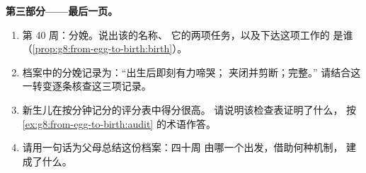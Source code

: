 \begin{problem}
\medskip\noindent\textbf{第三部分——最后一页。}
\begin{enumerate}[resume]
  \item 第 40 周：分娩。说出该的名称、
        它的两项任务，以及下达这项工作的
        是谁（\cref{prop:g8:from-egg-to-birth:birth}）。
  \item 档案中的分娩记录为：“出生后即刻有力啼哭；
        夹闭并剪断；完整。”
        请结合这一转变逐条核查这三项记录。
  \item 新生儿在按分钟记分的评分表中得分很高。
        请说明该检查表证明了什么，
        按\cref{ex:g8:from-egg-to-birth:audit}
        的术语作答。
  \item 请用一句话为父母总结这份档案：四十周
        由哪一个出发，借助何种机制，
        建成了什么。
\end{enumerate}
\end{problem}
